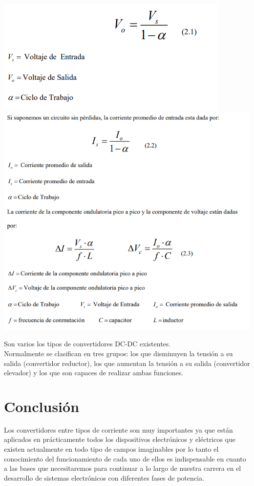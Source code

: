 \documentclass[12pt,a4paper]{article}
\begin{document}
\begin{flushleft}
\begin{center}
\includegraphics[scale=1]{imagenes/DC_DC1.PNG} 
\includegraphics[scale=1]{imagenes/DC_DC2.PNG} 
\end{center}
\end{flushleft}
Son varios los tipos de convertidores DC-DC existentes.\\ Normalmente se clasifican en tres grupos: los que disminuyen la tensión a su salida (convertidor reductor), los que aumentan la tensión a su salida (convertidor elevador) y los que son capaces de realizar ambas funciones.\\
\newpage
\section{Conclusión}
\begin{flushleft}
Los convertidores entre tipos de corriente son muy importantes ya que están aplicados en prácticamente todos los dispositivos electrónicos y eléctricos que existen actualmente en todo tipo de campos imaginables por lo tanto el conocimiento del funcionamiento de cada uno de ellos es indispensable en cuanto a las bases que necesitaremos para continuar a lo largo de nuestra carrera en el desarrollo de sistemas electrónicos con diferentes fases de potencia.
\linebreak
\linebreak
\linebreak
\linebreak
\linebreak
\end{flushleft}
\end{document}

